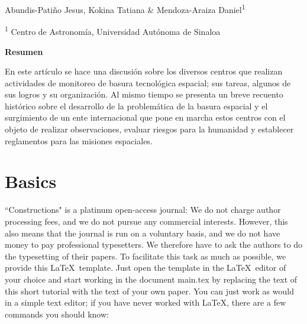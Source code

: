 \vspace{30pt}
\begin{center}
    \LARGE{}
\end{center}

\begin{center}
\vspace{4pt}
\large
    Abundis-Patiño Jesus, Kokina Tatiana \& Mendoza-Araiza Daniel\textsuperscript{1}
    
\small
   \textsuperscript{1} Centro de Astronomía, Universidad Autónoma de Sinaloa

\end{center}



\begin{small}
\begin{center}
\vspace{9pt}
\textbf{Resumen}    
\end{center}

\begin{adjustwidth}{20pt}{20pt}
\small \noindent En este artículo se hace una discusión sobre los diversos centros que realizan actividades de monitoreo de basura tecnológica espacial; sus tareas, algunos de sus logros y su organización. Al mismo tiempo se presenta un breve recuento histórico sobre el desarrollo de la problemática de la basura espacial y el surgimiento de un ente internacional que pone en marcha estos centros con el objeto de realizar observaciones, evaluar riesgos para la humanidad y establecer reglamentos para las misiones espaciales.
\end{adjustwidth}


\end{small}




\vspace{10pt}
\section{Basics}\label{Sec:Introduction}
``Constructions" is a platinum open-access journal: We do not charge author processing fees, and we do not pursue any commercial interests. However, this also means that the journal is run on a voluntary basis, and we do not have money to pay professional typesetters. We therefore have to ask the authors to do the typesetting of their papers. To facilitate this task as much as possible, we provide this \LaTeX \ template. Just open the template in the \LaTeX \  editor of your choice and start working in the document main.tex by replacing the text of this short tutorial with the text of your own paper. You can just work as would in a simple text editor; if you have never worked with \LaTeX, there are a few commands you should know:

